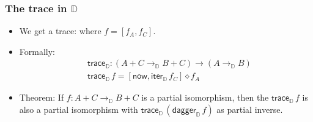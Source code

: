 \documentclass[12pt,t]{beamer}
\newcommand{\copair}[2]{[#1,#2]}
\newcommand{\now}{\mathsf{now}}
\newcommand{\D}{\mathbb{D}}
\newcommand{\Dapprox}{\mathbb{D}_{\approx}}
\newcommand{\iterD}{\mathsf{iter}_\D}
\newcommand{\traceD}{\mathsf{trace}_\D}
\newcommand{\daggerD}{\mathsf{dagger}_\D}
\begin{document}
\begin{frame}
\end{frame}

\begin{frame}
  \frametitle{The trace in $\D$}
  \begin{itemize}
    \item %
      We get a trace:
      where $f = \copair {f_A}{f_C}$.
    \item Formally:
      \begin{align*}
        & \traceD : (A + C \to_\D B + C) \to (A \to_\D B) \\
        & \traceD \,f = \copair{\now}{\iterD \,f_C}\diamond f_A
      \end{align*}
    \item Theorem: If $f : A + C \to_\D B + C$ is a partial
      isomorphism, then the $\traceD\,f$ is also a partial isomorphism
      with $\traceD\,(\daggerD\,f)$ as partial inverse.
  \end{itemize}
\end{frame}
\end{document}
